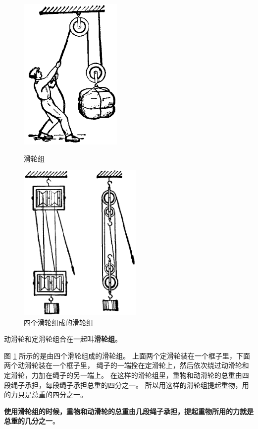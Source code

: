 \begin{figure}[htbp]
    \centering
    \begin{minipage}{7cm}
    \centering
    \includegraphics[width=5cm]{../pic/czwl1-ch7-26}
    \caption{滑轮组}\label{fig:7-26}
    \end{minipage}
    \qquad
    \begin{minipage}{7cm}
    \centering
    \includegraphics[width=6cm]{../pic/czwl1-ch7-27}
    \caption{四个滑轮组成的滑轮组}\label{fig:7-27}
    \end{minipage}
\end{figure}


动滑轮和定滑轮组合在一起叫\textbf{滑轮组}。

图 \ref{fig:7-27} 所示的是由四个滑轮组成的滑轮组。
上面两个定滑轮装在一个框子里，下面两个动滑轮装在一个框子里，
绳子的一端拴在定滑轮上，然后依次绕过动滑轮和定滑轮，力加在绳子的另一端上。
在这样的滑轮组里，重物和动滑轮的总重由四段绳子承担，每段绳子承担总重的四分之一。
所以用这样的滑轮组提起重物，用的力只是总重的四分之一。

\textbf{使用滑轮组的时候，重物和动滑轮的总重由几段绳子承担，提起重物所用的力就是总重的几分之一}。

